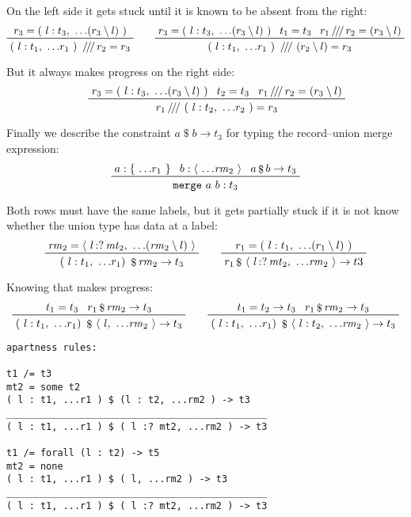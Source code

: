 \documentclass[11pt, twoside, reqno]{book}
\providecommand{\lcurvyangle}{\langle}
\providecommand{\rcurvyangle}{\rangle}
\begin{document}
On the left side it gets stuck until it is known to be absent from the right:
\begin{displaymath}
\prftree
  {r_3 = (\ l : t_3,\ \dots\!(r_3 \setminus l)\ )}
  {(\ l : t_1,\ \dots\!r_1\ )\ \mathop{/\!/\!/} r_2 = r_3}
\qquad
\prftree
  {r_3 = (\ l : t_3,\ \dots\!(r_3 \setminus l)\ )}
  {t_1 = t_3}
  {r_1 \mathop{/\!/\!/} r_2 = (r_3 \setminus l)}
  {(\ l : t_1,\ \dots\!r_1\ )\ \mathop{/\!/\!/}\ (r_2 \setminus l) = r_3}
\end{displaymath}

But it always makes progress on the right side:
\begin{displaymath}
\qquad
\prftree
  {r_3 = (\ l : t_3,\ \dots\!(r_3 \setminus l)\ )}
  {t_2 = t_3}
  {r_1 \mathop{/\!/\!/} r_2 = (r_3 \setminus l)}
  {r_1 \mathop{/\!/\!/}\ (\ l : t_2,\ \dots\!r_2\ ) = r_3}
\end{displaymath}

Finally we describe the constraint \(a \mathop{\$} b \to t_3\) for typing the record--union merge expression:
\begin{displaymath}
\prftree{a : \{\ \dots\!r_1\ \}}{b : \langle\ \dots\!\mathit{rm}_2\ \rangle}{a \mathop{\$} b \to t_3}{\texttt{merge}\ a\ b : t_3}
\end{displaymath}

Both rows must have the same labels, but it gets partially stuck if it is not know whether the union type has data at a label:
\begin{displaymath}
\prftree{\mathit{rm}_2 = \lcurvyangle\ l \mathop{{:}{?}} \mathit{mt}_2,\ \dots\!(\mathit{rm}_2 \setminus l)\ \rcurvyangle}{(\ l : t_1,\ \dots\!r_1 )\ \mathop{\$} \mathit{rm}_2 \to t_3}
\qquad
\prftree{r_1 = (\ l : t_1,\ \dots\!(r_1 \setminus l)\ )}{r_1 \mathop{\$}\ \lcurvyangle\ l \mathop{{:}{?}} \mathit{mt}_2,\ \dots\!\mathit{rm}_2\ \rcurvyangle \to t3}
\end{displaymath}

Knowing that makes progress:
\begin{displaymath}
\prftree{t_1 = t_3}{r_1 \mathop{\$} \mathit{rm}_2 \to t_3}
  {(\ l : t_1,\ \dots\!r_1 )\ \mathop{\$}\ \lcurvyangle\ l,\ \dots\!\mathit{rm}_2\ \rcurvyangle \to t_3}
\qquad
\prftree{t_1 = t_2 \to t_3}{r_1 \mathop{\$} \mathit{rm}_2 \to t_3}
  {(\ l : t_1,\ \dots\!r_1 )\ \mathop{\$}\ \lcurvyangle\ l : t_2,\ \dots\!\mathit{rm}_2\ \rcurvyangle \to t_3}
\end{displaymath}

\begin{verbatim}
apartness rules:

t1 /= t3
mt2 = some t2
( l : t1, ...r1 ) $ (l : t2, ...rm2 ) -> t3
______________________________________________
( l : t1, ...r1 ) $ ( l :? mt2, ...rm2 ) -> t3

t1 /= forall (l : t2) -> t5
mt2 = none
( l : t1, ...r1 ) $ ( l, ...rm2 ) -> t3
______________________________________________
( l : t1, ...r1 ) $ ( l :? mt2, ...rm2 ) -> t3
\end{verbatim}
\end{document}
